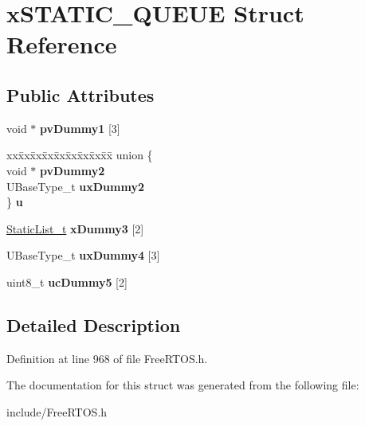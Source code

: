 \hypertarget{structxSTATIC__QUEUE}{}\section{x\+S\+T\+A\+T\+I\+C\+\_\+\+Q\+U\+E\+UE Struct Reference}
\label{structxSTATIC__QUEUE}
\subsection*{Public Attributes}
\begin{DoxyCompactItemize}
\item 
\mbox{\label{structxSTATIC__QUEUE_aacf22a66a8d723648995692ec77ee416}} 
void $\ast$ {\bfseries pv\+Dummy1} \mbox{[}3\mbox{]}
\item 
\mbox{\label{structxSTATIC__QUEUE_a8a896145a0d9376a7e2713afdd782c41}} 
\begin{tabbing}
xx\=xx\=xx\=xx\=xx\=xx\=xx\=xx\=xx\=\kill
union \{\\
\>void $\ast$ {\bfseries pvDummy2}\\
\>UBaseType\_t {\bfseries uxDummy2}\\
\} {\bfseries u}\\

\end{tabbing}\item 
\mbox{\label{structxSTATIC__QUEUE_add0de93e08b632124122850bcd543597}} 
\mbox{\hyperlink{structxSTATIC__LIST}{Static\+List\+\_\+t}} {\bfseries x\+Dummy3} \mbox{[}2\mbox{]}
\item 
\mbox{\label{structxSTATIC__QUEUE_a502854697731754ce445f6503d14b127}} 
U\+Base\+Type\+\_\+t {\bfseries ux\+Dummy4} \mbox{[}3\mbox{]}
\item 
\mbox{\label{structxSTATIC__QUEUE_a541c5044376603540cc3c9cabcbdc5e6}} 
uint8\+\_\+t {\bfseries uc\+Dummy5} \mbox{[}2\mbox{]}
\end{DoxyCompactItemize}


\subsection{Detailed Description}


Definition at line 968 of file Free\+R\+T\+O\+S.\+h.



The documentation for this struct was generated from the following file\+:\begin{DoxyCompactItemize}
\item 
include/Free\+R\+T\+O\+S.\+h\end{DoxyCompactItemize}
